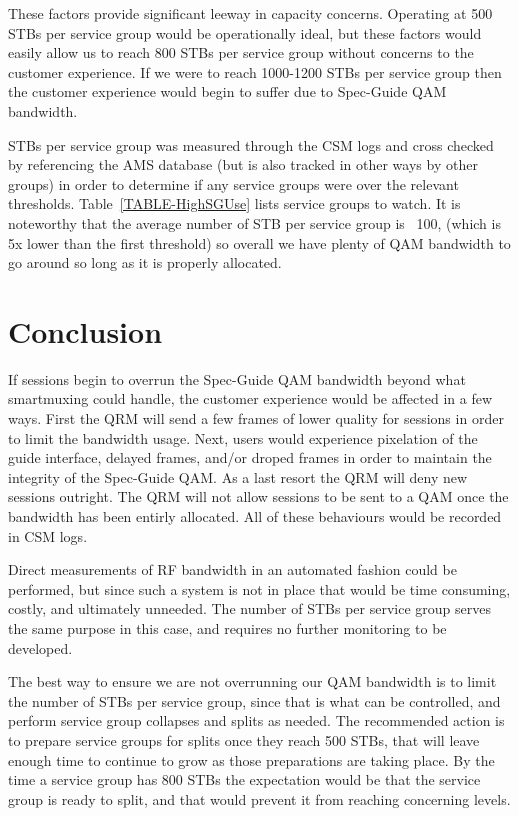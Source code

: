 \documentclass{article}
\begin{document}
These factors provide significant leeway in capacity concerns. Operating at 500 STBs per service group would be operationally ideal, but these factors would easily allow us to reach 800 STBs per service group without concerns to the customer experience. If we were to reach 1000-1200 STBs per service group then the customer experience would begin to suffer due to Spec-Guide QAM bandwidth. 

STBs per service group was measured through the CSM logs and cross checked by referencing the AMS database (but is also tracked in other ways by other groups) in order to determine if any service groups were over the relevant thresholds. Table~\ref{TABLE-HighSGUse} lists service groups to watch. It is noteworthy that the average number of STB per service group is ~100, (which is 5x lower than the first threshold) so overall we have plenty of QAM bandwidth to go around so long as it is properly allocated. 



\section{Conclusion}
\label{SECTION-Conclusion}

If sessions begin to overrun the Spec-Guide QAM bandwidth beyond what smartmuxing could handle, the customer experience would be affected in a few ways. First the QRM will send a few frames of lower quality for sessions in order to limit the bandwidth usage. Next, users would experience pixelation of the guide interface, delayed frames, and/or droped frames in order to maintain the integrity of the Spec-Guide QAM. As a last resort the QRM will deny new sessions outright. The QRM will not allow sessions to be sent to a QAM once the bandwidth has been entirly allocated. All of these behaviours would be recorded in CSM logs. 

Direct measurements of RF bandwidth in an automated fashion could be performed, but since such a system is not in place that would be time consuming, costly, and ultimately unneeded. The number of STBs per service group serves the same purpose in this case, and requires no further monitoring to be developed. 

The best way to ensure we are not overrunning our QAM bandwidth is to limit the number of STBs per service group, since that is what can be controlled, and perform service group collapses and splits as needed. The recommended action is to prepare service groups for splits once they reach 500 STBs, that will leave enough time to continue to grow as those preparations are taking place. By the time a service group has 800 STBs the expectation would be that the service group is ready to split, and that would prevent it from reaching concerning levels. 
\end{document}
